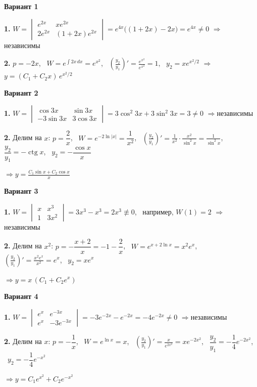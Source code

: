 \documentclass[11pt,a4paper]{article}
\begin{document}
\par\medskip\textbf{Вариант 1}\par

\textbf{1.} $\displaystyle W = \begin{vmatrix} e^{2x} & x e^{2x} \\ 2e^{2x} & (1 + 2x)e^{2x} \end{vmatrix} = e^{4x}\bigl((1 + 2x) - 2x\bigr) = e^{4x} \ne 0$ \quad$\Rightarrow$\quad независимы

\textbf{2.} $p = -2x$, \ $W = e^{\int 2x\,dx} = e^{x^2}$, \ $\displaystyle \left(\frac{y_2}{y_1}\right)' = \frac{e^{x^2}}{e^{x^2}} = 1$, \ $y_2 = x e^{x^2/2}$ \quad$\Rightarrow$\quad $\displaystyle y = (C_1 + C_2 x)\, e^{x^2/2}$

\par\medskip\textbf{Вариант 2}\par

\textbf{1.} $\displaystyle W = \begin{vmatrix} \cos 3x & \sin 3x \\ -3\sin 3x & 3\cos 3x \end{vmatrix} = 3\cos^2 3x + 3\sin^2 3x = 3 \ne 0$ \quad$\Rightarrow$\quad независимы

\textbf{2.} Делим на $x$: $p = \dfrac{2}{x}$, \ $W = e^{-2\ln|x|} = \dfrac{1}{x^2}$, \ $\displaystyle \left(\frac{y_2}{y_1}\right)' = \frac{1}{x^2} \cdot \frac{x^2}{\sin^2 x} = \frac{1}{\sin^2 x}$, \ $\dfrac{y_2}{y_1} = -\operatorname{ctg} x$, \ $y_2 = -\dfrac{\cos x}{x}$

\quad$\Rightarrow$\quad $\displaystyle y = \frac{C_1 \sin x + C_2 \cos x}{x}$

\par\medskip\textbf{Вариант 3}\par

\textbf{1.} $\displaystyle W = \begin{vmatrix} x & x^3 \\ 1 & 3x^2 \end{vmatrix} = 3x^3 - x^3 = 2x^3 \not\equiv 0$, \ например, $W(1) = 2$ \quad$\Rightarrow$\quad независимы

\textbf{2.} Делим на $x^2$: $p = -\dfrac{x + 2}{x} = -1 - \dfrac{2}{x}$, \ $W = e^{x + 2\ln x} = x^2 e^{x}$, \ $\displaystyle \left(\frac{y_2}{y_1}\right)' = \frac{x^2 e^{x}}{x^2} = e^{x}$, \ $y_2 = x e^{x}$

\quad$\Rightarrow$\quad $\displaystyle y = x\,(C_1 + C_2 e^{x})$

\par\medskip\textbf{Вариант 4}\par

\textbf{1.} $\displaystyle W = \begin{vmatrix} e^{x} & e^{-3x} \\ e^{x} & -3e^{-3x} \end{vmatrix} = -3e^{-2x} - e^{-2x} = -4e^{-2x} \ne 0$ \quad$\Rightarrow$\quad независимы

\textbf{2.} Делим на $x$: $p = -\dfrac1x$, \ $W = e^{\ln x} = x$, \ $\displaystyle \left(\frac{y_2}{y_1}\right)' = \frac{x}{e^{2x^2}} = x e^{-2x^2}$, \ $\dfrac{y_2}{y_1} = -\dfrac14 e^{-2x^2}$, \ $y_2 = -\dfrac14 e^{-x^2}$

\quad$\Rightarrow$\quad $\displaystyle y = C_1 e^{x^2} + C_2 e^{-x^2}$
\end{document}

